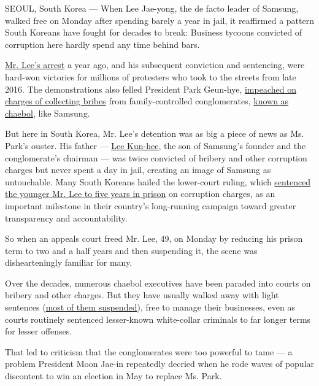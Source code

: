 SEOUL, South Korea --- When Lee Jae-yong, the de facto leader of
Samsung, walked free on Monday after spending barely a year in jail, it
reaffirmed a pattern South Koreans have fought for decades to break:
Business tycoons convicted of corruption here hardly spend any time
behind bars.

\href{https://www.nytimes3xbfgragh.onion/2017/02/16/world/asia/korea-samsung-lee-jae-yong.html}{Mr.
Lee's arrest} a year ago, and his subsequent conviction and sentencing,
were hard-won victories for millions of protesters who took to the
streets from late 2016. The demonstrations also felled President Park
Geun-hye,
\href{https://www.nytimes3xbfgragh.onion/2017/04/17/world/asia/park-geun-hye-south-korea-president-indictment.html}{impeached
on charges of collecting bribes} from family-controlled conglomerates,
\href{https://www.nytimes3xbfgragh.onion/2017/03/04/business/south-korea-samsung-bribery-lee.html}{known
as chaebol}, like Samsung.

But here in South Korea, Mr. Lee's detention was as big a piece of news
as Ms. Park's ouster. His father ---
\href{http://www.nytimes3xbfgragh.onion/2009/12/30/business/global/30samsung.html}{Lee
Kun-hee}, the son of Samsung's founder and the conglomerate's chairman
--- was twice convicted of bribery and other corruption charges but
never spent a day in jail, creating an image of Samsung as untouchable.
Many South Koreans hailed the lower-court ruling, which
\href{https://www.nytimes3xbfgragh.onion/2017/08/25/business/samsung-bribery-embezzlement-conviction-jay-lee-south-korea.html}{sentenced
the younger Mr. Lee to five years in prison} on corruption charges, as
an important milestone in their country's long-running campaign toward
greater transparency and accountability.

So when an appeals court freed Mr. Lee, 49, on Monday by reducing his
prison term to two and a half years and then suspending it, the scene
was dishearteningly familiar for many.

Over the decades, numerous chaebol executives have been paraded into
courts on bribery and other charges. But they have usually walked away
with light sentences
(\href{https://www.nytimes3xbfgragh.onion/2017/12/22/business/korea-lotte-corruption-conviction.html}{most
of them suspended}), free to manage their businesses, even as courts
routinely sentenced lesser-known white-collar criminals to far longer
terms for lesser offenses.

That led to criticism that the conglomerates were too powerful to tame
--- a problem President Moon Jae-in repeatedly decried when he rode
waves of popular discontent to win an election in May to replace Ms.
Park.

